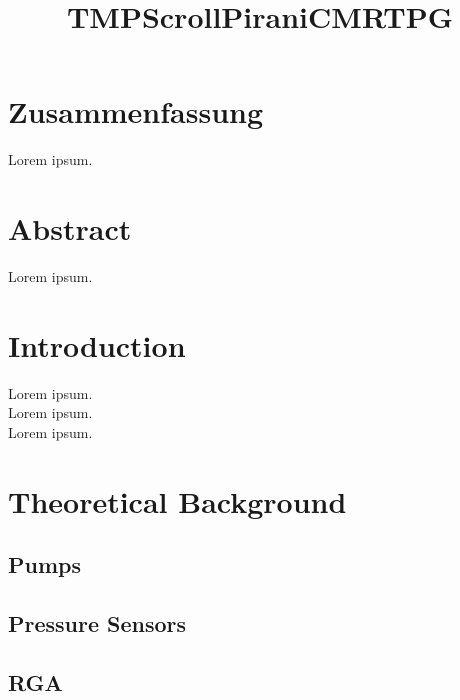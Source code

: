 \documentclass[fontsize=11pt, paper=a4, pagesize=auto, parskip=half, titlepage=on, english, ngerman]{scrartcl}
\begin{document}


\newpage

\section*{Zusammenfassung}
Lorem ipsum.

\section*{Abstract}
Lorem ipsum.

\newpage

\tableofcontents

\clearpage
\newpage
\section{Introduction}
Lorem ipsum.
\vspace{0.5cm} \\
Lorem ipsum.
\vspace{0.5cm} \\
Lorem ipsum.

\clearpage
\newpage
\section{Theoretical Background}
\label{sec: background}

\subsection{Pumps}
\label{subsec:pumps}
\title{TMP}
\label{title:tmp}


\title{Scroll}

\subsection{Pressure Sensors}
\label{subsec:pressure sensors}
\title{Pirani}
\label{title:pirani}

\title{CMR}
\label{title:cmr}

\title{TPG}
\label{title:tpg}
\subsection{RGA}
\label{subsec:rga}
\end{document}
